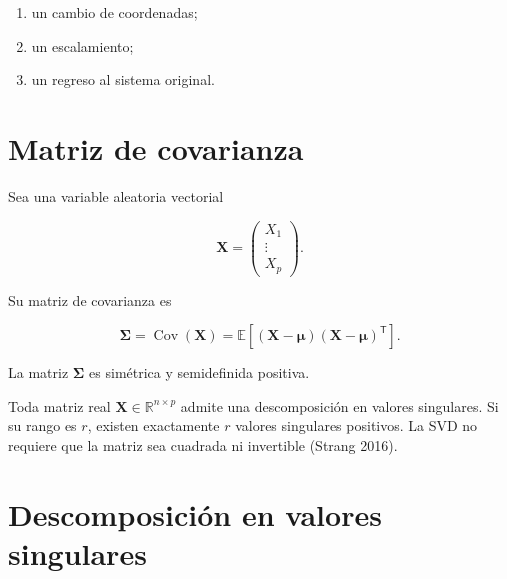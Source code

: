 \documentclass[
  spanish,
  10.5pt,
  letterpaper,
  DIV=11,
  numbers=noendperiod,
  oneside,
  open=any]{scrreprt}
\providecommand{\tightlist}{%
  \setlength{\itemsep}{0pt}\setlength{\parskip}{0pt}}
\theoremstyle{definition}
\theoremstyle{definition}
\theoremstyle{plain}
\theoremstyle{remark}
\begin{document}
\begin{enumerate}
\def\labelenumi{\arabic{enumi}.}
\tightlist
\item
  un cambio de coordenadas;
\item
  un escalamiento;
\item
  un regreso al sistema original.
\end{enumerate}

\section*{Matriz de covarianza}\label{matriz-de-covarianza}


Sea una variable aleatoria vectorial

\[
\mathbf{X}
=
\begin{pmatrix}
X_1\\
\vdots\\
X_p
\end{pmatrix}.
\]

Su matriz de covarianza es

\[
\boldsymbol{\Sigma}
=
\operatorname{Cov}(\mathbf{X})
=
\mathbb{E}
\left[
(\mathbf{X}-\boldsymbol{\mu})
(\mathbf{X}-\boldsymbol{\mu})^{\mathsf T}
\right].
\]

La matriz \(\boldsymbol{\Sigma}\) es simétrica y semidefinida positiva.

\begin{tcolorbox}[enhanced jigsaw, arc=.35mm, bottomrule=.15mm, bottomtitle=1mm, breakable, colback=white, colbacktitle=quarto-callout-important-color!10!white, colframe=quarto-callout-important-color-frame, coltitle=black, left=2mm, leftrule=.75mm, opacityback=0, opacitybacktitle=0.6, rightrule=.15mm, title=\textcolor{quarto-callout-important-color}{\faExclamation}\hspace{0.5em}{SVD y rango}, titlerule=0mm, toprule=.15mm, toptitle=1mm]

Toda matriz real \(\mathbf{X}\in\mathbb{R}^{n\times p}\) admite una
descomposición en valores singulares. Si su rango es \(r\), existen
exactamente \(r\) valores singulares positivos. La SVD no requiere que
la matriz sea cuadrada ni invertible (Strang 2016).

\end{tcolorbox}

\section*{Descomposición en valores
singulares}\label{descomposiciuxf3n-en-valores-singulares}
\end{document}
